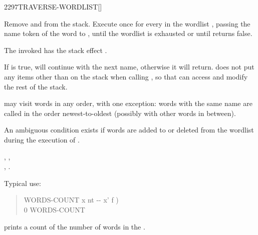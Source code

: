 
\begin{worddef}{2297}{TRAVERSE-WORDLIST}[]%
\item {}

	Remove  and  from the stack.  Execute
	 once for every
	 in the
	wordlist ,
	passing the name token  of the word to ,
	until the wordlist is exhausted or until  returns false.

	The invoked  has the stack effect
	.

	If  is true,  will continue
	with the next name, otherwise it will return.  
	does not put any items other than  on the stack when
	calling , so that  can access and modify the
	rest of the stack.


	 may visit words in any order, with one
	exception: words with the same name are called in the order
	newest-to-oldest (possibly with other words in between).

	An ambiguous condition exists if words are added to or deleted from
	the wordlist  during the execution of
	.

\see {},
	, \\
	,
	.

	\begin{rationale}
		Typical use:

		\begin{quote}\ttfamily
 			\word{:} WORDS-COUNT  x nt -{}- x' f )
				  
			\word{;}
		\\
			0  WORDS-COUNT
			 
		\end{quote}

		prints a count of the number of words in the .


\end{rationale}
\end{worddef}
